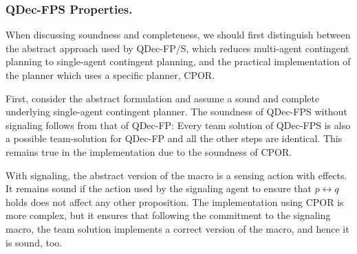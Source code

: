 \documentclass[letterpaper]{article} %
\theoremstyle{definition}
\begin{document}

\subsubsection{QDec-FPS Properties.} 
When discussing soundness and completeness, we should first
distinguish between the abstract approach used by QDec-FP/S, which reduces multi-agent contingent planning to single-agent contingent planning, and the practical implementation of the planner which uses a specific planner, CPOR.

First, consider the abstract formulation and assume a sound and complete underlying single-agent contingent planner. The soundness of QDec-FPS without signaling follows from that of QDec-FP: Every team solution of QDec-FPS is also a possible team-solution for QDec-FP and all the other steps are identical. This remains true in the implementation due to the soundness of CPOR. 

With signaling, the abstract version of the macro is a sensing action with effects.
It remains sound if the action used by the signaling agent to ensure that $p\leftrightarrow q$ holds does not affect any other proposition. The implementation using CPOR is more complex, but it ensures that following the commitment to the signaling macro, the team solution implements a correct version of the macro, and hence it is sound, too. 
\end{document}
